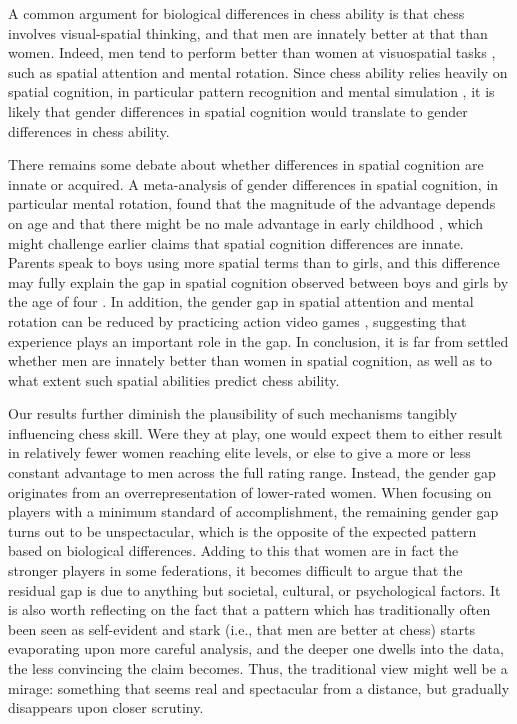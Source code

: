 \documentclass[9pt,twocolumn,twoside,lineno]{pnas-new}
\begin{document}
A common argument for biological differences in chess ability is that chess involves visual-spatial thinking, and that men are innately better at that than women. Indeed, men tend to perform better than women at visuospatial tasks \cite{kimura1999sex, terlecki2005important, voyer1995magnitude}, such as spatial attention and mental rotation.  Since chess ability relies heavily on spatial cognition, in particular pattern recognition and mental simulation \cite{chase1973perception}, it is likely that gender differences in spatial cognition would translate to gender differences in chess ability. 

There remains some debate about whether differences in spatial cognition are innate or acquired. A meta-analysis of gender differences in spatial cognition, in particular mental rotation, found that the magnitude of the advantage depends on age and that there might be no male advantage in early childhood \cite{lauer2019development}, which might challenge earlier claims that spatial cognition differences are innate. Parents speak to boys using more spatial terms than to girls, and this difference may fully explain the gap in spatial cognition observed between boys and girls by the age of four \cite{pruden2017}. In addition, the gender gap in spatial attention and mental rotation can be reduced by practicing action video games \cite{feng2007playing}, suggesting that experience plays an important role in the gap. In conclusion, it is far from settled whether men are innately better than women in spatial cognition, as well as to what extent such spatial abilities predict chess ability.

Our results further diminish the plausibility of such mechanisms tangibly influencing chess skill. Were they at play, one would expect them to either result in relatively fewer women reaching elite levels, or else to give a more or less constant advantage to men across the full rating range. Instead, the gender gap originates from an overrepresentation of lower-rated women. When focusing on players with a minimum standard of accomplishment, the remaining gender gap turns out to be unspectacular, which is the opposite of the expected pattern based on biological differences. Adding to this that women are in fact the stronger players in some federations, it becomes difficult to argue that the residual gap is due to anything but societal, cultural, or psychological factors. It is also worth reflecting on the fact that a pattern which has traditionally often been seen as self-evident and stark (i.e., that men are better at chess) starts evaporating upon more careful analysis, and the deeper one dwells into the data, the less convincing the claim becomes. Thus, the traditional view might well be a mirage: something that seems real and spectacular from a distance, but gradually disappears upon closer scrutiny.
\end{document}
